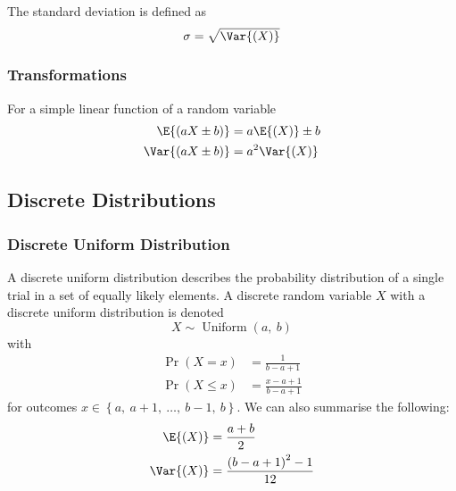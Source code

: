 \documentclass{article}
\begin{document}
\begin{definition}
    The standard deviation is defined as
    \begin{equation*}
        \sigma = \sqrt{\Var{\left( X \right)}}
    \end{equation*}
\end{definition}
\subsubsection{Transformations}
For a simple linear function of a random variable
\begin{align*}
    \E{\left( aX \pm b \right)}   & = a\E{\left( X \right)} \pm b \\
    \Var{\left( aX \pm b \right)} & = a^2\Var{\left( X \right)}
\end{align*}
\subsection{Discrete Distributions}
\subsubsection{Discrete Uniform Distribution}
A discrete uniform distribution describes the probability distribution
of a single trial in a set of equally likely elements. A discrete
random variable \(X\) with a discrete uniform distribution is denoted
\begin{equation*}
    X \sim \operatorname{Uniform}{\left( a,\: b \right)}
\end{equation*}
with
\begin{align*}
    \Pr{\left( X = x \right)}    & = \frac{1}{b - a + 1}         \\
    \Pr{\left( X \leq x \right)} & = \frac{x - a + 1}{b - a + 1}
\end{align*}
for outcomes \(x \in \left\{ a,\: a + 1,\: \dots,\: b - 1,\: b \right\}\).
We can also summarise the following:
\begin{align*}
    \E{\left( X \right)}   & = \frac{a + b}{2}                           \\
    \Var{\left( X \right)} & = \frac{\left( b - a + 1 \right)^2 - 1}{12}
\end{align*}
\end{document}
